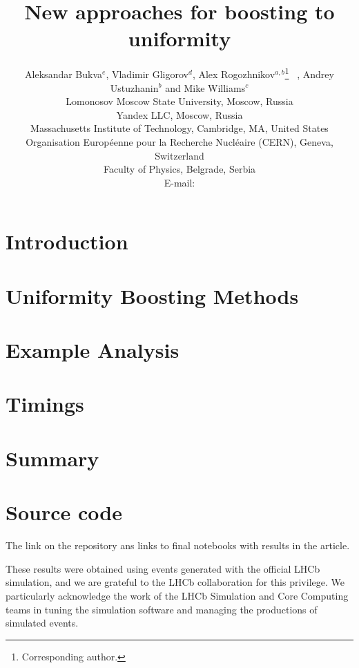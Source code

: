 \documentclass{JINST}
\title{New approaches for boosting to uniformity}
\author{
Aleksandar Bukva$^e$, 
Vladimir Gligorov$^d$,
Alex Rogozhnikov$^{a,b}$\thanks{Corresponding author.}~ ,
Andrey Ustuzhanin$^b$ and
Mike Williams$^c$\\
\llap{$^a$}Lomonosov Moscow State University, Moscow, Russia\\
\llap{$^b$}Yandex LLC, Moscow, Russia\\
\llap{$^c$}Massachusetts Institute of Technology, Cambridge, MA, United States \\
\llap{$^d$}Organisation Europ\'eenne pour la Recherche Nucl\'eaire (CERN), Geneva, Switzerland  \\
\llap{$^e$}Faculty of Physics, Belgrade, Serbia \\
E-mail: \email{alex.rogozhnikov@yandex.ru}}
\theoremstyle{definition}
\theoremstyle{remark}
\begin{document}
\maketitle


\section{Introduction}



\section{Uniformity Boosting Methods}


\section{Example Analysis}




\section{Timings}



\section{Summary}



\section{Source code}


The link on the repository ans links to final notebooks with results in the article.

\acknowledgments

These results were obtained using events generated with the official LHCb simulation, and we are grateful to the LHCb collaboration for this privilege. 
We particularly acknowledge the work of the LHCb Simulation and Core Computing teams in tuning the simulation software and managing the productions of simulated events.
\end{document}
